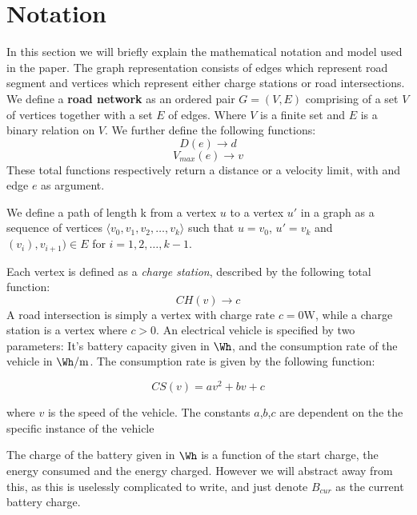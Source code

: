 \section{Notation}
In this section we will briefly explain the mathematical notation and model used in the paper. The graph representation consists of edges which represent road segment and vertices which represent either charge stations or road intersections. We define a \textbf{road network} as an ordered pair \(G=(V,E)\) comprising of a set $V$ of vertices together with a set $E$ of edges. Where $V$ is a finite set and $E$ is a binary relation on $V$. We further define the following functions:
\[ D(e)\rightarrow d \] 
\[ V_{max}(e)\rightarrow v \] 
These total functions respectively return a distance or a velocity limit, with and edge $e$ as argument.

We define a path of length k from a vertex $u$ to a vertex $u'$ in a graph as a sequence of vertices $\langle v_0,v_1,v_2,\dots,v_k \rangle$ such that $u=v_0$, $u'=v_k$ and $(v_{i}),v_{i+1})\in E$ for $i=1,2,\dots ,k-1$.

Each vertex is defined as a \textit{charge station}, described by the following total function:
\[CH(v)\rightarrow c\]
A road intersection is simply a vertex with charge rate $c = 0\si{\W}$, while a charge station is a vertex where $c > 0$. An electrical vehicle is specified by two parameters: It's battery capacity given in $\si{\Wh}$, and the consumption rate of the vehicle in $\si{\Wh\per\metre}$. The consumption rate is given by the following function:

\[CS(v)=av^2+bv+c\]

where $v$ is the speed of the vehicle. The constants $a$,$b$,$c$ are dependent on the the specific instance of the vehicle  

The charge of the battery given in $\si{\Wh}$ is a function of the start charge, the energy consumed and the energy charged. However we will abstract away from this, as this is uselessly complicated to write, and just denote $B_{cur}$ as the current battery charge.